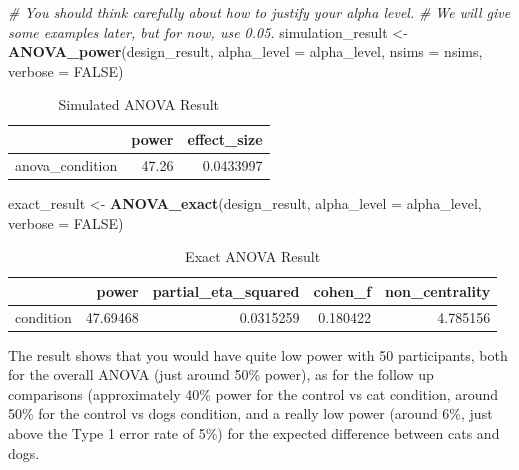 \documentclass[]{book}
\newenvironment{Shaded}{\begin{snugshade}}{\end{snugshade}}
\newcommand{\CommentTok}[1]{\textcolor[rgb]{0.56,0.35,0.01}{\textit{#1}}}
\newcommand{\DataTypeTok}[1]{\textcolor[rgb]{0.13,0.29,0.53}{#1}}
\newcommand{\KeywordTok}[1]{\textcolor[rgb]{0.13,0.29,0.53}{\textbf{#1}}}
\newcommand{\NormalTok}[1]{#1}
\newcommand{\OtherTok}[1]{\textcolor[rgb]{0.56,0.35,0.01}{#1}}
\newcommand{\StringTok}[1]{\textcolor[rgb]{0.31,0.60,0.02}{#1}}
\begin{document}
\begin{Shaded}
\begin{Highlighting}[]
\CommentTok{# You should think carefully about how to justify your alpha level.}
\CommentTok{# We will give some examples later, but for now, use 0.05.}
\NormalTok{simulation_result <-}\StringTok{ }\KeywordTok{ANOVA_power}\NormalTok{(design_result, }
                                 \DataTypeTok{alpha_level =}\NormalTok{ alpha_level, }
                                 \DataTypeTok{nsims =}\NormalTok{ nsims,}
                                 \DataTypeTok{verbose =} \OtherTok{FALSE}\NormalTok{)}
\end{Highlighting}
\end{Shaded}

\begin{table}[!h]

\caption{\label{tab:unnamed-chunk-32}Simulated ANOVA Result}
\centering
\begin{tabular}{l|r|r}
\hline
  & power & effect\_size\\
\hline
anova\_condition & 47.26 & 0.0433997\\
\hline
\end{tabular}
\end{table}

\begin{Shaded}
\begin{Highlighting}[]
\NormalTok{exact_result <-}\StringTok{ }\KeywordTok{ANOVA_exact}\NormalTok{(design_result,}
                            \DataTypeTok{alpha_level =}\NormalTok{ alpha_level,}
                            \DataTypeTok{verbose =} \OtherTok{FALSE}\NormalTok{)}
\end{Highlighting}
\end{Shaded}

\begin{table}[!h]

\caption{\label{tab:unnamed-chunk-34}Exact ANOVA Result}
\centering
\begin{tabular}{l|r|r|r|r}
\hline
  & power & partial\_eta\_squared & cohen\_f & non\_centrality\\
\hline
condition & 47.69468 & 0.0315259 & 0.180422 & 4.785156\\
\hline
\end{tabular}
\end{table}

The result shows that you would have quite low power with 50 participants, both for the overall ANOVA (just around 50\% power), as for the follow up comparisons (approximately 40\% power for the control vs cat condition, around 50\% for the control vs dogs condition, and a really low power (around 6\%, just above the Type 1 error rate of 5\%) for the expected difference between cats and dogs.
\end{document}
